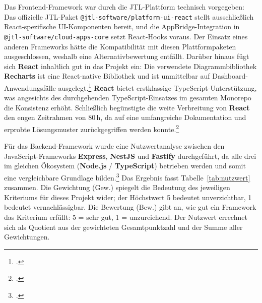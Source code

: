 \documentclass[11pt, a4paper, oneside]{report}
\begin{document}
Das Frontend-Framework war durch die JTL-Plattform technisch vorgegeben: Das offizielle
JTL-Paket \texttt{@jtl-software/platform-ui-react} stellt ausschließlich React-spezifische
UI-Komponenten bereit, und die AppBridge-Integration in \texttt{@jtl-software/cloud-apps-core}
setzt React-Hooks voraus. Der Einsatz eines anderen Frameworks hätte die Kompatibilität
mit diesen Plattformpaketen ausgeschlossen, weshalb eine Alternativbewertung entfällt.
Darüber hinaus fügt sich \textbf{React} inhaltlich gut in das Projekt ein: Die verwendete
Diagrammbibliothek \textbf{Recharts} ist eine React-native Bibliothek und ist unmittelbar auf
Dashboard-Anwendungsfälle ausgelegt.\footcite{recharts} \textbf{React} bietet erstklassige TypeScript-Unterstützung,
was angesichts des durchgehenden TypeScript-Einsatzes im gesamten Monorepo die
Konsistenz erhöht. Schließlich begünstigte die weite Verbreitung von \textbf{React} den engen
Zeitrahmen von 80\,h, da auf eine umfangreiche Dokumentation und erprobte Lösungsmuster
zurückgegriffen werden konnte.\footcite{react_docs}

Für das Backend-Framework wurde eine Nutzwertanalyse zwischen den JavaScript-Frameworks
\textbf{Express}, \textbf{NestJS} und \textbf{Fastify} durchgeführt, da alle drei
im gleichen Ökosystem (\textbf{Node.js} / \textbf{TypeScript}) betrieben werden und somit eine
vergleichbare Grundlage bilden.\footcite{nodejs_docs} Das Ergebnis fasst
Tabelle~\ref{tab:nutzwert} zusammen. Die Gewichtung (Gew.) spiegelt die Bedeutung
des jeweiligen Kriteriums für dieses Projekt wider; der Höchstwert 5 bedeutet
unverzichtbar, 1 bedeutet vernachlässigbar. Die Bewertung (Bew.) gibt an, wie
gut ein Framework das Kriterium erfüllt: 5 = sehr gut, 1 = unzureichend. Der
Nutzwert errechnet sich als Quotient aus der gewichteten Gesamtpunktzahl und der
Summe aller Gewichtungen.
\end{document}
